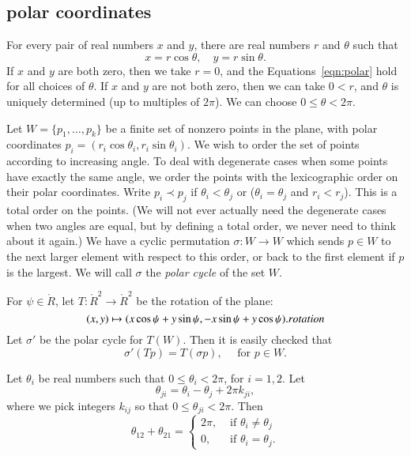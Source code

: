 \subsection{polar coordinates}
\label{sec:polar}


For every pair of real numbers $x$ and $y$,  there are real numbers
$r$ and $\theta$ such that
    \begin{equation}\label{eqn:polar}
    x = r\cos\theta,\quad y = r\sin\theta.
    \end{equation}
If $x$ and $y$ are both zero, then we take $r=0$, and the
Equations~\ref{eqn:polar} hold for all choices of $\theta$. If $x$
and $y$ are not both zero, then we can take $0<r$, and $\theta$ is
uniquely determined (up to multiples of $2\pi$).  We can choose
$0\le\theta < 2\pi$.

Let $W=\{p_1,\ldots,p_k\}$ be a finite set of
nonzero points in the plane, with
polar coordinates $p_i = (r_i\cos\theta_i,r_i\sin\theta_i)$.
We wish to order the set of points according to increasing angle.
To deal with degenerate cases when some points have exactly
the same angle,
we order the points with the lexicographic order on their
polar coordinates.  Write $p_i \prec p_j$ if
$\theta_i < \theta_j$ or ($\theta_i=\theta_j$ and $r_i<r_j$).
This is a total order on the points.  (We will not ever
actually need the degenerate cases when two angles are equal,
but by defining a total order, we never need to think about
it again.)
We have a cyclic permutation $\sigma:W\to W$ which sends
$p\in W$ to the next larger element with respect to this order,
or back to the first element if $p$ is the largest.
We will call $\sigma$ the {\it polar cycle}
of the set $W$.




For $\psi\in\ring{R}$, let $T:\ring{R}^2\to\ring{R}^2$ be the
rotation of the plane:
   \begin{equation}
   \label{eqn:rotate}
   (x,y) \mapsto  (x\cos\psi + y\sin\psi,-x\sin\psi+y\cos\psi).
   \indy{Index}{rotation}
   \end{equation}
Let $\sigma'$ be the polar cycle for $T(W)$.  Then it is easily
checked that
$$
   \sigma'(T p) = T (\sigma p),\quad \text{ for } p\in W. 
$$

\begin{lemma}\label{lemma:polar2}
Let $\theta_i$ be real numbers such that $0\le \theta_i < 2\pi$, for $i=1,2$.
Let $$\theta_{ji} = \theta_i - \theta_j + 2\pi k_{ji},$$
where we pick integers $k_{ij}$ so that $0\le \theta_{ji}< 2\pi$.
Then 
$$
  \theta_{12} + \theta_{21} = \begin{cases}
    2\pi, & \text{ if }\theta_i\ne\theta_j\\
    0,    & \text{ if }\theta_i=\theta_j.
    \end{cases}
$$
\end{lemma}

